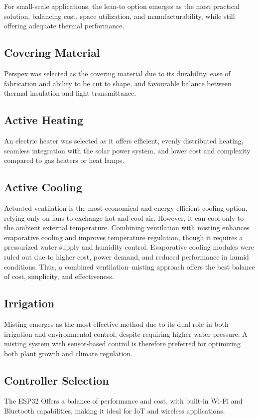 For small-scale applications, the lean-to option emerges as the most practical solution, balancing cost, space utilization, and manufacturability, while still offering adequate thermal performance.

\subsection{Covering Material}

Perspex was selected as the covering material due to its durability, ease of fabrication and ability to be cut to shape, and favourable balance between thermal insulation and light transmittance.

\subsection{Active Heating}

An electric heater was selected as it offers efficient, evenly distributed heating, seamless integration with the solar power system, and lower cost and complexity compared to gas heaters or heat lamps.

\subsection{Active Cooling}

Actuated ventilation is the most economical and energy-efficient cooling option, relying only on fans to exchange hot and cool air. However, it can cool only to the ambient external temperature. Combining ventilation with misting enhances evaporative cooling and improves temperature regulation, though it requires a pressurized water supply and humidity control. Evaporative cooling modules were ruled out due to higher cost, power demand, and reduced performance in humid conditions. Thus, a combined ventilation–misting approach offers the best balance of cost, simplicity, and effectiveness.

\subsection{Irrigation}

Misting emerges as the most effective method due to its dual role in both irrigation and environmental control, despite requiring higher water pressure. A misting system with sensor-based control is therefore preferred for optimizing both plant growth and climate regulation.

\subsection{Controller Selection}


The ESP32 Offers a balance of performance and cost, with built-in Wi-Fi and Bluetooth capabilities, making it ideal for IoT and wireless applications.




